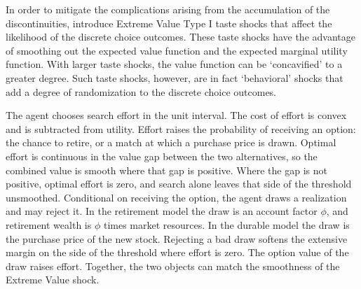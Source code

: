 In order to mitigate the complications arising from the accumulation of the
discontinuities, \citet{Iskhakov2017-jb} introduce Extreme
Value Type I taste shocks that affect the likelihood of the discrete choice outcomes.
These taste shocks have the advantage of smoothing out the expected value function and
the expected marginal utility function. With larger taste shocks, the value function can
be `concavified' to a greater degree. Such taste shocks, however, are in fact `behavioral'
shocks that add a degree of randomization to the discrete choice outcomes.


The agent chooses search effort in the unit interval. The cost of effort is convex and
is subtracted from utility. Effort raises the probability of receiving an option: the chance
to retire, or a match at which a purchase price is drawn. Optimal effort is continuous in
the value gap between the two alternatives, so the combined value is smooth where that
gap is positive. Where the gap is not positive, optimal effort is zero, and search alone
leaves that side of the threshold unsmoothed. Conditional on receiving the option, the
agent draws a realization and may reject it. In the retirement model the draw is an
account factor $\phi$, and retirement wealth is $\phi$ times market resources. In the
durable model the draw is the purchase price of the new stock. Rejecting a bad draw
softens the extensive margin on the side of the threshold where effort is zero. The option
value of the draw raises effort. Together, the two objects can match the smoothness of
the Extreme Value shock.

